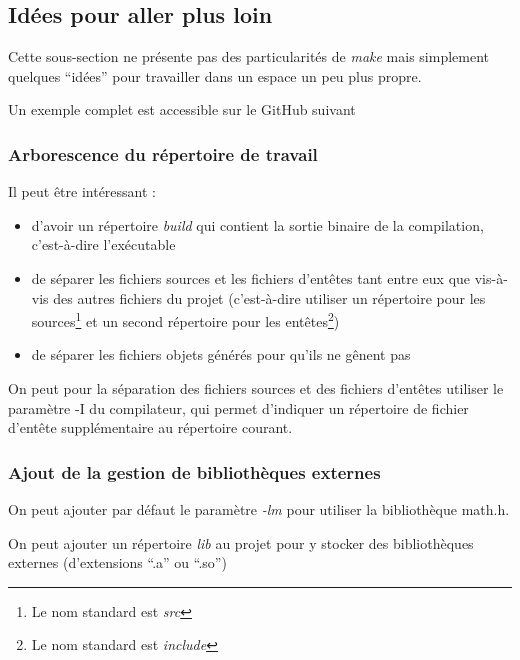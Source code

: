 \documentclass[../../../main.tex]{subfiles}
\begin{document}
\subsection{Idées pour aller plus loin}
Cette sous-section ne présente pas des particularités de \textit{make} mais simplement quelques ``idées'' pour travailler dans un espace un peu plus propre.

Un exemple complet est accessible sur le GitHub suivant %
\subsubsection{Arborescence du répertoire de travail}
Il peut être intéressant :
\begin{itemize}
	\item d'avoir un répertoire \textit{build} qui contient la sortie binaire de la compilation, c'est-à-dire l'exécutable
	\item de séparer les fichiers sources et les fichiers d'entêtes tant entre eux que vis-à-vis des autres fichiers du projet (c'est-à-dire utiliser un répertoire pour les sources\footnote{Le nom standard est \textit{src}} et un second répertoire pour les entêtes\footnote{Le nom standard est \textit{include}})
	\item de séparer les fichiers objets générés pour qu'ils ne gênent pas
\end{itemize}
On peut pour la séparation des fichiers sources et des fichiers d'entêtes utiliser le paramètre \textsf{-I} du compilateur, qui permet d'indiquer un répertoire de fichier d'entête supplémentaire au répertoire courant.
\subsubsection{Ajout de la gestion de bibliothèques externes}
On peut ajouter par défaut le paramètre \textit{-lm} pour utiliser la bibliothèque \textsf{math.h}.
 
On peut ajouter un répertoire \textit{lib} au projet pour y stocker des bibliothèques externes (d'extensions ``.a'' ou ``.so'')
\end{document}
